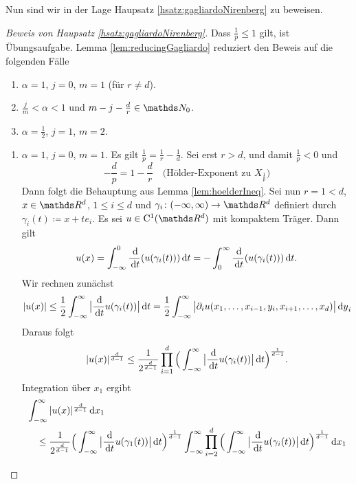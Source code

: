 Nun sind wir in der Lage Haupsatz \ref{hsatz:gagliardoNirenberg} zu beweisen.

\begin{proof}[Beweis von Haupsatz \ref{hsatz:gagliardoNirenberg}]
  Dass $\frac{1}{p} \leq 1$ gilt, ist Übungsaufgabe.
  Lemma \ref{lem:reducingGagliardo} reduziert den Beweis auf die folgenden Fälle
  \begin{enumerate}
    \item $\alpha = 1$, $j = 0$, $m = 1$ (für $r \neq d$).
    \item $\frac{j}{m} < \alpha < 1$ und $m - j - \frac{d}{r} \in \N_0$.
    \item $\alpha = \frac{1}{2}$, $j = 1$, $m = 2$.
  \end{enumerate}

  \begin{enumerate}
    \item $\alpha = 1$, $j = 0$, $m = 1$.
      Es gilt $\frac{1}{p} = \frac{1}{r} - \frac{1}{d}$.
      Sei erst $r > d$, und damit $\frac{1}{p} < 0$ und
      $$
      -\frac{d}{p} = 1 - \frac{d}{r} \quad\text{(Hölder-Exponent zu $X_{\frac{1}{p}}$)}
      $$
      Dann folgt die Behauptung aus Lemma \ref{lem:hoelderIneq}.
      Sei nun $r = 1 < d$, $x \in \R^d$, $1 \leq i \leq d$ und $\gamma_i \colon (-\infty, \infty) \to \R^d$ definiert durch $\gamma_i (t) \coloneqq x + t e_i$.
      Es sei $u \in \CC^1(\R^d)$ mit kompaktem Träger. Dann gilt
      $$
      u(x) = \int_{-\infty}^0 \frac{\, {\operatorname{d}\!{}}}{\, {\operatorname{d}\!{t}}} (u(\gamma_i(t))) \, {\operatorname{d}\!{t}} = -\int_0^\infty \frac{\, {\operatorname{d}\!{}}}{\, {\operatorname{d}\!{t}}} (u(\gamma_i(t))) \, {\operatorname{d}\!{t}}.
      $$
      Wir rechnen zunächst
      $$
      |u(x)| \leq \frac{1}{2} \int_{-\infty}^\infty \big| \frac{\, {\operatorname{d}\!{}}}{\, {\operatorname{d}\!{t}}} u(\gamma_i(t)) \big| \, {\operatorname{d}\!{t}} = \frac{1}{2} \int_{-\infty}^\infty \big| \partial_i u(x_1,\dots,x_{i - 1},y_i,x_{i + 1}, \dots,x_d) \big| \, {\operatorname{d}\!{y}}_i
      $$
      Daraus folgt
      $$
      |u(x)|^{\frac{d}{d - 1}} \leq \frac{1}{2^{\frac{d}{d - 1}}} \prod_{i = 1}^d \Big( \int_{-\infty}^\infty \big| \frac{\, {\operatorname{d}\!{}}}{\, {\operatorname{d}\!{t}}} u(\gamma_i(t)) \big| \, {\operatorname{d}\!{t}} \Big)^{\frac{1}{d - 1}}.
      $$
      Integration über $x_1$ ergibt
      \begin{align*}
        &\int_{-\infty}^\infty |u(x)|^{\frac{\d{}}{d - 1}} \d x_1  \\
        &\quad \leq \frac{1}{2^{\frac{d}{d - 1}}} \Big( \int_{-\infty}^\infty \big| \frac{\d{}}{\d t} u(\gamma_1(t)) \big| \d t \Big)^{\frac{1}{d - 1}} \int_{-\infty}^\infty \prod_{i = 2}^d \Big(\int_{-\infty}^\infty  \big| \frac{\d{}}{\d t} u(\gamma_i(t)) \big| \d t \Big)^{\frac{1}{d - 1}} \d x_1 \\

\end{align*}
\end{enumerate}
\end{proof}
